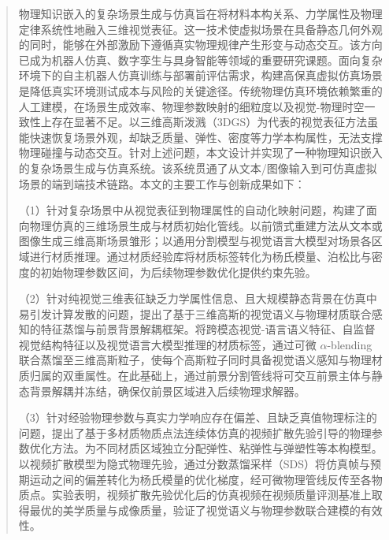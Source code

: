 ﻿%

\begin{abstract}
    物理知识嵌入的复杂场景生成与仿真旨在将材料本构关系、力学属性及物理定律系统性地融入三维视觉表征。这一技术使虚拟场景在具备静态几何外观的同时，能够在外部激励下遵循真实物理规律产生形变与动态交互。该方向已成为机器人仿真、数字孪生与具身智能等领域的重要研究课题。面向复杂环境下的自主机器人仿真训练与部署前评估需求，构建高保真虚拟仿真场景是降低真实环境测试成本与风险的关键途径。传统物理仿真环境依赖繁重的人工建模，在场景生成效率、物理参数映射的细粒度以及视觉-物理时空一致性上存在显著不足。以三维高斯泼溅（3DGS）为代表的视觉表征方法虽能快速恢复场景外观，却缺乏质量、弹性、密度等力学本构属性，无法支撑物理碰撞与动态交互。针对上述问题，本文设计并实现了一种物理知识嵌入的复杂场景生成与仿真系统。该系统贯通了从文本/图像输入到可仿真虚拟场景的端到端技术链路。本文的主要工作与创新成果如下：

    （1）针对复杂场景中从视觉表征到物理属性的自动化映射问题，构建了面向物理仿真的三维场景生成与材质初始化管线。以前馈式重建方法从文本或图像生成三维高斯场景雏形；以通用分割模型与视觉语言大模型对场景各区域进行材质推理。通过材质经验库将材质标签转化为杨氏模量、泊松比与密度的初始物理参数区间，为后续物理参数优化提供约束先验。

    （2）针对纯视觉三维表征缺乏力学属性信息、且大规模静态背景在仿真中易引发计算发散的问题，提出了基于三维高斯的视觉语义与物理材质联合感知的特征蒸馏与前景背景解耦框架。将跨模态视觉-语言语义特征、自监督视觉结构特征以及视觉语言大模型推理的材质标签，通过可微 $\alpha$-blending 联合蒸馏至三维高斯粒子，使每个高斯粒子同时具备视觉语义感知与物理材质归属的双重属性。在此基础上，通过前景分割管线将可交互前景主体与静态背景解耦并冻结，确保仅前景区域进入后续物理求解器。

    （3）针对经验物理参数与真实力学响应存在偏差、且缺乏真值物理标注的问题，提出了基于多材质物质点法连续体仿真的视频扩散先验引导的物理参数优化方法。为不同材质区域独立分配弹性、粘弹性与弹塑性等本构模型。以视频扩散模型为隐式物理先验，通过分数蒸馏采样（SDS）将仿真帧与预期运动之间的偏差转化为杨氏模量的优化梯度，经可微物理管线反传至各物质点。实验表明，视频扩散先验优化后的仿真视频在视频质量评测基准上取得最优的美学质量与成像质量，验证了视觉语义与物理参数联合建模的有效性。

\end{abstract}

